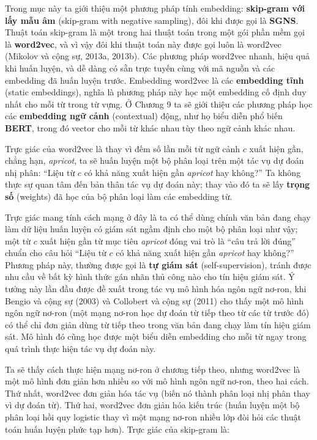 Trong mục này ta giới thiệu một phương pháp tính embedding: \textbf{skip-gram với lấy mẫu âm} (skip-gram with negative sampling), đôi khi được gọi là \textbf{SGNS}. Thuật toán skip-gram là một trong hai thuật toán trong một gói phần mềm gọi là \textbf{word2vec}, và vì vậy đôi khi thuật toán này được gọi luôn là word2vec (Mikolov và cộng sự, 2013a, 2013b). Các phương pháp word2vec nhanh, hiệu quả khi huấn luyện, và dễ dàng có sẵn trực tuyến cùng với mã nguồn và các embedding đã huấn luyện trước. Embedding word2vec là các \textbf{embedding tĩnh} (static embeddings), nghĩa là phương pháp này học một embedding cố định duy nhất cho mỗi từ trong từ vựng. Ở Chương 9 ta sẽ giới thiệu các phương pháp học các \textbf{embedding ngữ cảnh} (contextual) động, như họ biểu diễn phổ biến \textbf{BERT}, trong đó vector cho mỗi từ khác nhau tùy theo ngữ cảnh khác nhau.

Trực giác của word2vec là thay vì đếm số lần mỗi từ ngữ cảnh $c$ xuất hiện gần, chẳng hạn, \emph{apricot}, ta sẽ huấn luyện một bộ phân loại trên một tác vụ dự đoán nhị phân: ``Liệu từ $c$ có khả năng xuất hiện gần \emph{apricot} hay không?'' Ta không thực sự quan tâm đến bản thân tác vụ dự đoán này; thay vào đó ta sẽ lấy \textbf{trọng số} (weights) đã học của bộ phân loại làm các embedding từ.

Trực giác mang tính cách mạng ở đây là ta có thể dùng chính văn bản đang chạy làm dữ liệu huấn luyện có giám sát ngầm định cho một bộ phân loại như vậy; một từ $c$ xuất hiện gần từ mục tiêu \emph{apricot} đóng vai trò là ``câu trả lời đúng'' chuẩn cho câu hỏi ``Liệu từ $c$ có khả năng xuất hiện gần \emph{apricot} hay không?'' Phương pháp này, thường được gọi là \textbf{tự giám sát} (self-supervision), tránh được nhu cầu về bất kỳ hình thức gán nhãn thủ công nào cho tín hiệu giám sát. Ý tưởng này lần đầu được đề xuất trong tác vụ mô hình hóa ngôn ngữ nơ-ron, khi Bengio và cộng sự (2003) và Collobert và cộng sự (2011) cho thấy một mô hình ngôn ngữ nơ-ron (một mạng nơ-ron học dự đoán từ tiếp theo từ các từ trước đó) có thể chỉ đơn giản dùng từ tiếp theo trong văn bản đang chạy làm tín hiệu giám sát. Mô hình đó cũng học được một biểu diễn embedding cho mỗi từ ngay trong quá trình thực hiện tác vụ dự đoán này.

Ta sẽ thấy cách thực hiện mạng nơ-ron ở chương tiếp theo, nhưng word2vec là một mô hình đơn giản hơn nhiều so với mô hình ngôn ngữ nơ-ron, theo hai cách. Thứ nhất, word2vec đơn giản hóa tác vụ (biến nó thành phân loại nhị phân thay vì dự đoán từ). Thứ hai, word2vec đơn giản hóa kiến trúc (huấn luyện một bộ phân loại hồi quy logistic thay vì một mạng nơ-ron nhiều lớp đòi hỏi các thuật toán huấn luyện phức tạp hơn). Trực giác của skip-gram là:


